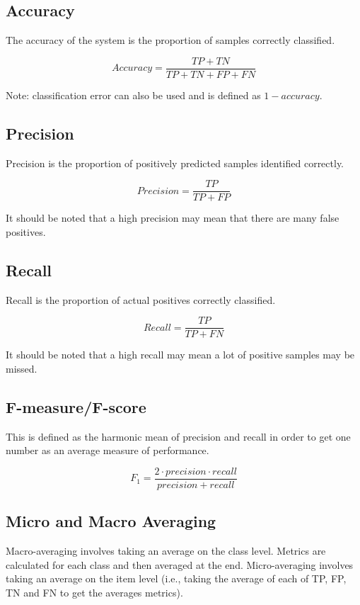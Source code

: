 \subsection{Accuracy}

The accuracy of the system is the proportion of samples correctly classified.

$$ Accuracy = \frac{TP + TN}{TP + TN + FP + FN} $$

Note: classification error can also be used and is defined as $ 1 - accuracy $.

\subsection{Precision}

Precision is the proportion of positively predicted samples identified correctly.

$$ Precision = \frac{TP}{TP + FP} $$

It should be noted that a high precision may mean that there are many false positives.

\subsection{Recall}

Recall is the proportion of actual positives correctly classified.

$$ Recall = \frac{TP}{TP + FN} $$

It should be noted that a high recall may mean a lot of positive samples may be missed.

\subsection{F-measure/F-score}

This is defined as the harmonic mean of precision and recall in order to get one number as an average measure of performance.

$$ F_1 = \frac{2 \cdot precision \cdot recall}{precision + recall} $$

\subsection{Micro and Macro Averaging} \label{ssec:eval_metric_averaging}

Macro-averaging involves taking an average on the class level. Metrics are calculated for each class and then averaged at the end. Micro-averaging involves taking an average on the item level (i.e., taking the average of each of TP, FP, TN and FN to get the averages metrics).